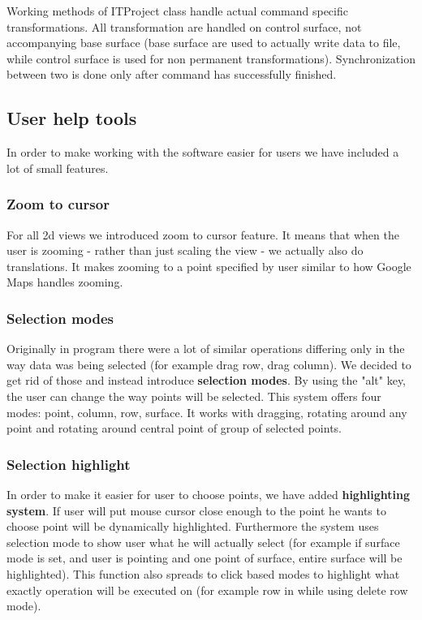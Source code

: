 \documentclass[a4paper, 11pt, article]{report}
\begin{document}
Working methods of ITProject class handle actual command specific transformations. All transformation are handled on control surface, not accompanying base surface (base surface are used to actually write data to file, while control surface is used for non permanent transformations). Synchronization between two is done only after command has successfully finished.

\subsection{User help tools}

In order to make working with the software easier for users we have included a lot of small features.

\subsubsection{Zoom to cursor}

For all 2d views we introduced zoom to cursor feature. It means that when the user is zooming - rather than just scaling the view - we actually also do translations. It makes zooming to a point specified by user similar to how Google Maps handles zooming.

\subsubsection{Selection modes}

Originally in program there were a lot of similar operations differing only in the way data was being selected (for example drag row, drag column). We decided to get rid of those and instead introduce \textbf{selection modes}. By using the "alt" key, the user can change the way points will be selected. This system offers four modes: point, column, row, surface. It works with dragging, rotating around any point and rotating around central point of group of selected points.

\subsubsection{Selection highlight}

In order to make it easier for user to choose points, we have added \textbf{highlighting system}. If user will put mouse cursor close enough to the point he wants to choose point will be dynamically highlighted. Furthermore the system uses selection mode to show user what he will actually select (for example if surface mode is set, and user is pointing and one point of surface, entire surface will be highlighted). This function also spreads to click based modes to highlight what exactly operation will be executed on (for example row in while using delete row mode).
\end{document}
